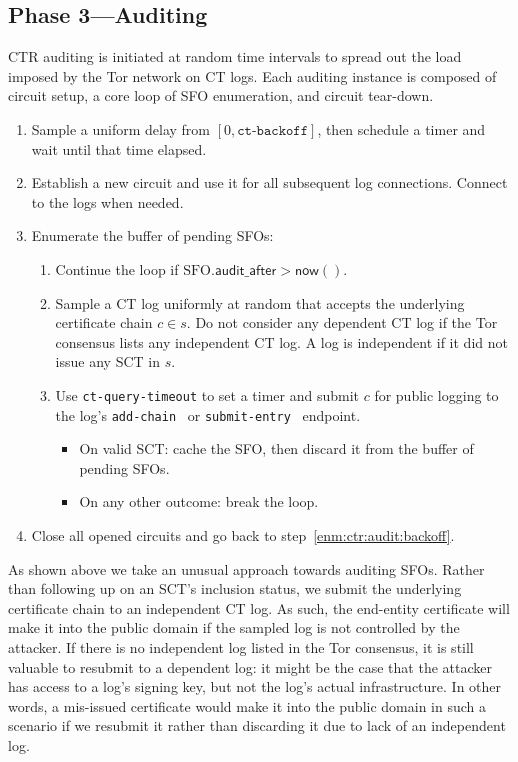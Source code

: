 \subsection{Phase 3---Auditing} \label{sec:base:phase3}
CTR auditing is initiated at random time intervals to spread out the load
imposed by the Tor network on CT logs.  Each auditing instance is composed of
circuit setup, a core loop of SFO enumeration, and circuit tear-down.

\begin{enumerate}
	\item\label{enm:ctr:audit:backoff} Sample a uniform delay from
			$[0, \texttt{ct-backoff}]$,
		then schedule a timer and wait until that time elapsed.
	\item\label{enm:ctr:audit:log-circuit} Establish a new circuit and use it
		for all subsequent log connections.  Connect to the logs when needed.
	\item\label{enm:ctr:audit:loop} Enumerate the buffer of pending SFOs:
		\begin{enumerate}
			\item\label{enm:ctr:audit:too-soon} Continue the loop if
				$\textrm{SFO}.\mathsf{audit\_after} > \mathsf{now}()$.
			\item\label{enm:ctr:audit:sample}
				Sample a CT log uniformly at random that accepts the underlying
				certificate chain $c \in s$.  Do not consider any dependent CT
				log if the Tor consensus lists any independent CT log.  A log
				is independent if it did not issue any SCT in $s$.
			\item\label{enm:ctr:audit:log} Use \texttt{ct-query-timeout} to set
				a timer and submit $c$ for public logging to the log's
				\texttt{add-chain}~\cite{ct} or
				\texttt{submit-entry}~\cite{ct/bis} endpoint.
				\begin{itemize}
					\item\label{enm:ctr:audit:log:success} On valid
						SCT: cache the SFO, then discard it from the buffer of
						pending SFOs.
					\item\label{enm:ctr:audit:log:fail} On any other outcome:
						break the loop.
				\end{itemize}
		\end{enumerate}
	\item\label{enm:ctr:audit:teardown} Close all opened circuits and go back to
		step~\ref{enm:ctr:audit:backoff}.
\end{enumerate}

As shown above we take an unusual approach towards auditing SFOs.  Rather than
following up on an SCT's inclusion status, we submit the underlying certificate
chain to an independent CT log.  As such, the end-entity certificate will make
it into the public domain if the sampled log is not controlled by the attacker.
If there is no independent log listed in the Tor consensus, it is still valuable
to resubmit to a dependent log:
	it might be the case that the attacker has access to a log's signing key,
	but not the log's actual infrastructure.
In other words, a mis-issued certificate would make it into the public domain in
such a scenario if we resubmit it rather than discarding it due to lack of
an independent log.

